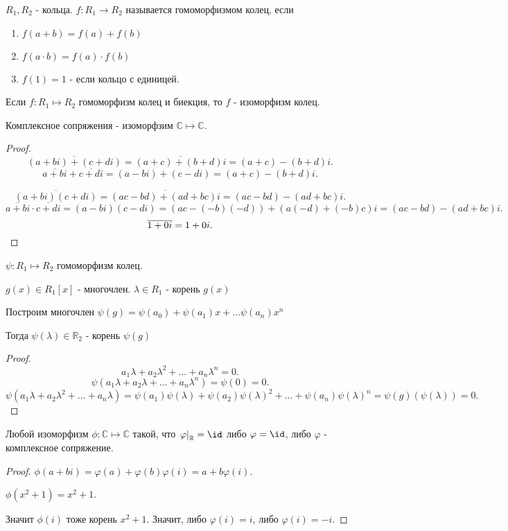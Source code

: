 \begin{definition} 
    $R_1, R_2$ - кольца. $f : R_1 \to R_2$ называется гомоморфизмом колец, если
    \begin{enumerate}
        \item $f(a+b) = f(a)+f(b)$
        \item $f(a\cdot b) = f(a) \cdot f(b)$
        \item $f(1) = 1$ - если кольцо с единицей.
    \end{enumerate}
\end{definition}
\begin{definition} 
    Если $f : R_1 \mapsto R_2$ гомоморфизм колец и биекция, то $f$ - изоморфизм колец.
\end{definition}
\begin{statement} 
    Комплексное сопряжения - изоморфзим $\mathbb{C} \mapsto \mathbb{C}$.
    \begin{proof}
       
        \[ \overline{(a+bi)+(c+di)} = \overline{(a+c)+(b+d)i} = (a+c)-(b+d)i .\]
        \[ \overline{a+bi}+\overline{c+di} = (a-bi)+(c-di) = (a+c)-(b+d)i .\]

        \[ \overline{(a+bi)(c+di)} = \overline{(ac-bd)+(ad+bc)i} = (ac-bd)-(ad+bc)i .\]
        \[ \overline{a+bi}\cdot \overline{c+di} = (a-bi)(c-di) = (ac-(-b)(-d))+(a(-d)+(-b)c)i = (ac-bd)-(ad+bc)i .\]
        \[ \overline{1+0i} = 1+0i .\qedhere\] 
    \end{proof}
\end{statement}
\begin{lemma} 
    $\psi : R_1 \mapsto R_2$ гомоморфизм колец.

    $g(x)\in R_1[x]$ - многочлен. $\lambda\in R_1$ - корень $g(x)$

    Построим многочлен $\psi(g) = \psi(a_0)+\psi(a_1)x + \ldots \psi(a_n)x^{n}$

    Тогда $\psi(\lambda)\in \mathbb{R}_2$ - корень $\psi(g)$
    \begin{proof}
        \[ a_1\lambda + a_2\lambda^2 + \ldots + a_n\lambda^{n} = 0 .\]
        \[ \psi(a_1\lambda+a_2\lambda + \ldots + a_n\lambda^{n}) = \psi(0) = 0 .\]
        \[ \psi(a_1\lambda + a_2\lambda^2 + \ldots + a_n\lambda) = \psi(a_1)\psi(\lambda) + \psi(a_2)\psi(\lambda)^2 + \ldots + \psi(a_n)\psi(\lambda)^{n} = \psi(g)(\psi(\lambda)) = 0 .\] 
    \end{proof}
\end{lemma}
\begin{statement} 
    Любой изоморфизм $\phi : \mathbb{C} \mapsto \mathbb{C}$ такой, что $\left.\varphi\right|_{\mathbb{R}} = \id$ либо $\varphi = \id$, либо $\varphi$ - комплексное сопряжение.
        \begin{proof}
            $\phi(a+bi) = \varphi(a)+\varphi(b)\varphi(i) = a+b\varphi(i)$.

            $\phi(x^2+1) = x^2+1$. 

            Значит $\phi(i)$ тоже корень $x^2+1$. Значит, либо $\varphi(i)=i$, либо $\varphi(i)=-i$.
        \end{proof}
\end{statement}
